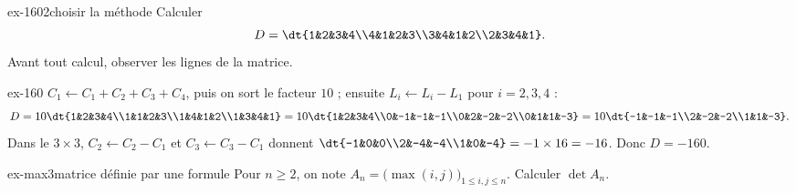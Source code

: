
\begin{exo}{ex-160}{2}{choisir la méthode}
Calculer
\[D=\dt{1&2&3&4\\4&1&2&3\\3&4&1&2\\2&3&4&1}.\]
Avant tout calcul, observer les lignes de la matrice.
\end{exo}

\begin{corrige}{ex-160}
$C_1\leftarrow C_1+C_2+C_3+C_4$, puis on sort le facteur $10$ ; ensuite $L_i\leftarrow L_i-L_1$ pour $i=2,3,4$ :
\[D=10\dt{1&2&3&4\\1&1&2&3\\1&4&1&2\\1&3&4&1}=10\dt{1&2&3&4\\0&-1&-1&-1\\0&2&-2&-2\\0&1&1&-3}=10\dt{-1&-1&-1\\2&-2&-2\\1&1&-3}.\]
Dans le $3\times3$, $C_2\leftarrow C_2-C_1$ et $C_3\leftarrow C_3-C_1$ donnent $\dt{-1&0&0\\2&-4&-4\\1&0&-4}=-1\times16=-16$. Donc $D=-160$.
\end{corrige}

\begin{exo}{ex-max}{3}{matrice définie par une formule}
Pour $n\geq2$, on note $A_n=\big(\max(i,j)\big)_{1\leq i,j\leq n}$. Calculer $\det A_n$.
\end{exo}

